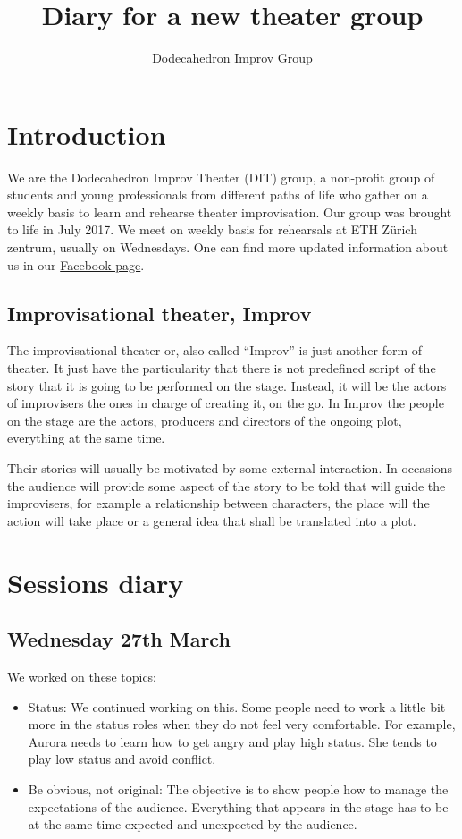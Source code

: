 \documentclass[11pt,a4paper,fleqn,twoside]{article}
\title{Diary for a new theater group}
\author{Dodecahedron Improv Group}
\begin{document}
\maketitle
\clearpage
\tableofcontents
\clearpage

\section{Introduction}

We are the Dodecahedron Improv Theater (DIT) group, a non-profit group of students and young professionals from different paths of life who gather on a weekly basis to learn and rehearse theater improvisation. Our group was brought to life in July 2017. We meet on weekly basis for rehearsals at ETH Zürich zentrum, usually on Wednesdays. One can find more updated information about us in our \href{https://www.facebook.com/dodecahedronimprovtheater/}{Facebook page}.

\subsection{Improvisational theater, Improv}

The improvisational theater or, also called ``Improv'' is just another form of theater. It just have the particularity that there is not predefined script of the story that it is going to be performed on the stage. Instead, it will be the actors of improvisers the ones in charge of creating it, on the go. In Improv the people on the stage are the actors, producers and directors of the ongoing plot, everything at the same time.

Their stories will usually be motivated by some external interaction. In occasions the audience will provide some aspect of the story to be told that will guide the improvisers, for example a relationship between characters, the place will the action will take place or a general idea that shall be translated into a plot. 

\section{Sessions diary}

\subsection{Wednesday 27th March}

We worked on these topics: 
%
\begin{itemize}
  \item Status: We continued working on this. Some people need to work a little bit more in the status roles when they do not feel very comfortable. For example, Aurora needs to learn how to get angry and play high status. She tends to play low status and avoid conflict.
  \item Be obvious, not original: The objective is to show people how to manage the expectations of the audience. Everything that appears in the stage has to be at the same time expected and unexpected by the audience. 
\end{itemize}
\end{document}
